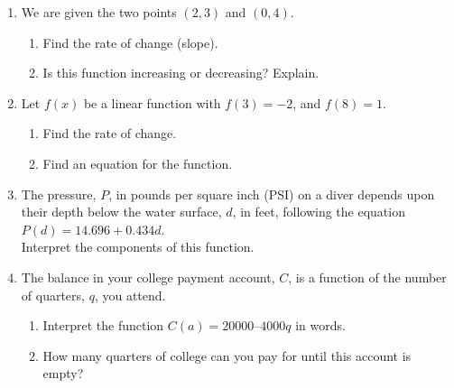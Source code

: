 \documentclass[12pt, twoside]{report}
\begin{document}
\begin{enumerate}
	
	\item We are given the two points $(2, 3)$ and $(0, 4)$.
	\begin{enumerate}
		\item Find the rate of change (slope).  
		\item Is this function increasing or decreasing? Explain.
	\end{enumerate} 
	\vfill 
	
	\item Let $f(x)$ be a linear function with $f(3)=-2$, and $f(8)=1$.
	\begin{enumerate}
		\item Find the rate of change.
		\item Find an equation for the function.
	\end{enumerate}
	\vfill



\pagebreak

	\item The pressure, $P$, in pounds per square inch (PSI) on a diver depends upon their depth below the water surface, $d$, in feet, following the equation $P(d)=14.696+0.434d$. \\
	Interpret the components of this function.
	\vfill
	
	\item The balance in your college payment account, $C$, is a function of the number of quarters, $q$, you attend.  
	\begin{enumerate}
		\item Interpret the function $C(a) = 20000 – 4000q$ in words.  
		\item How many quarters of college can you pay for until this account is empty?
	\end{enumerate}
	\vfill 

	

\end{enumerate}
\end{document}
